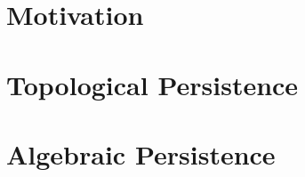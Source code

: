\documentclass[b5paper, 11pt, twoside]{report}
\begin{document}
	\newpage
	\tableofcontents

	\newpage
	\listoffigures

	\singlespacing
	\chapter{Motivation}
	

	\chapter{Topological Persistence}
	

	\chapter{Algebraic Persistence}
	

	\singlespacing
	\printbibliography

	\newpage
	\printindex
\end{document}
